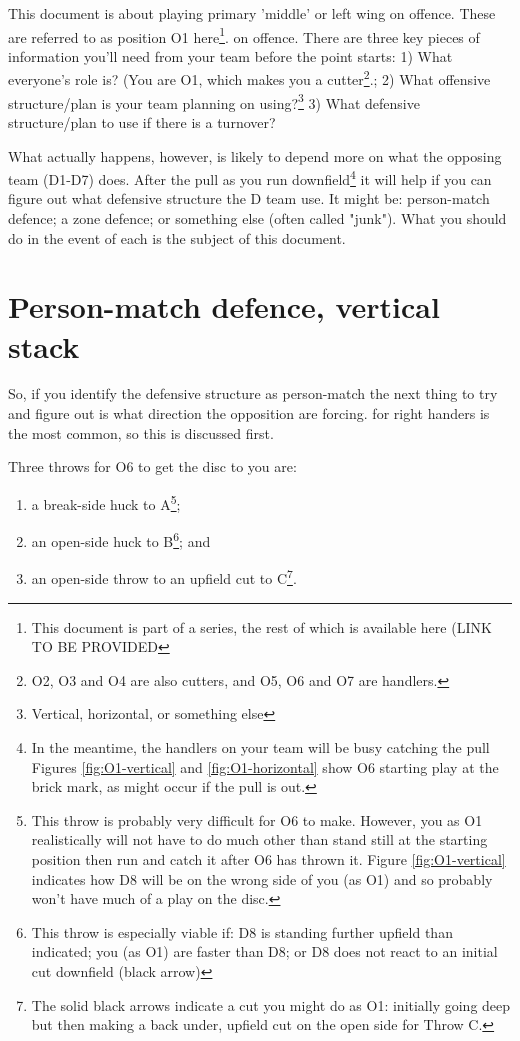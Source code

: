 \documentclass{tufte-handout}
\begin{document}
This document is about 
playing primary 'middle' 
or left wing 
on offence. 
These are
referred to as position O1 here\footnote{This document
is part of a series, 
the rest of which is available here (LINK TO BE PROVIDED}.
 on offence.
There are three key pieces of information you'll need from your team before the point starts:
1) What everyone's role is? 
(You are O1, 
which makes you a cutter\footnote{  
O2, O3 and O4 are also cutters, and
O5, O6 and O7 are handlers.}.;
2) What offensive structure/plan is your team planning on using?\footnote{
Vertical,
horizontal, 
or something else}
3) What defensive structure/plan to use if there is a turnover? 

What actually happens, 
however, 
is likely to depend more on 
what the opposing team (D1-D7) does. 
After the pull 
as you run downfield\footnote{
In the meantime, 
the handlers on your team 
will be busy 
catching the pull
Figures \ref{fig:O1-vertical} and  \ref{fig:O1-horizontal} 
show O6 starting play 
at the brick mark, 
as might occur if 
the pull is out.} it will help 
if you can figure out 
what defensive structure the D team use.
It might be:
person-match defence;
a zone defence; or
something else
(often called "junk").
What you should do 
in the event of each
is the subject of this document. 


\section{Person-match defence, vertical stack}\label{sec:vertical}
So, if you identify the defensive structure as person-match
the next thing to try and figure out
is what direction the opposition are forcing. 
 for right handers is the most common, 
so this is discussed first. 

Three throws for O6 
to get the disc 
to you are:
\begin{enumerate}
\item a break-side 
huck to A\footnote{
This throw is 
probably
very difficult for O6 to make. 
However, you as O1
realistically will not have to do much
other than stand still at the starting position
then run and catch it
after O6 has thrown it. 
Figure \ref{fig:O1-vertical} indicates how 
D8 will be on the wrong side of you (as O1)
and so probably won't have much of a play on the disc.};

\item an open-side huck to B\footnote{
This throw is especially viable if: 
D8 is standing further upfield than indicated; 
you (as O1) are faster than D8; or 
D8 does not react to an initial cut downfield (black arrow)}; and 
\item an open-side throw 
to an upfield cut to C\footnote{
The solid black arrows indicate 
a cut you might do as O1:
initially going deep
but then making a back under, 
upfield cut 
on the open side
for Throw C.}.
\end{enumerate}
\end{document}
